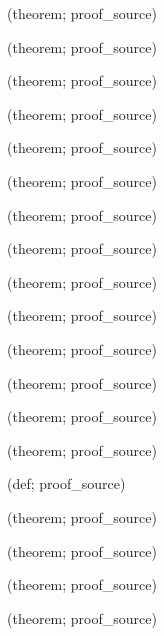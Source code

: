 \noindent{} {\scriptsize (theorem; proof\_source)}\par
\noindent{} {\scriptsize (theorem; proof\_source)}\par
\noindent{} {\scriptsize (theorem; proof\_source)}\par
\noindent{} {\scriptsize (theorem; proof\_source)}\par
\noindent{} {\scriptsize (theorem; proof\_source)}\par
\noindent{} {\scriptsize (theorem; proof\_source)}\par
\noindent{} {\scriptsize (theorem; proof\_source)}\par
\noindent{} {\scriptsize (theorem; proof\_source)}\par
\noindent{} {\scriptsize (theorem; proof\_source)}\par
\noindent{} {\scriptsize (theorem; proof\_source)}\par
\noindent{} {\scriptsize (theorem; proof\_source)}\par
\noindent{} {\scriptsize (theorem; proof\_source)}\par
\noindent{} {\scriptsize (theorem; proof\_source)}\par
\noindent{} {\scriptsize (theorem; proof\_source)}\par
\noindent{} {\scriptsize (def; proof\_source)}\par
\noindent{} {\scriptsize (theorem; proof\_source)}\par
\noindent{} {\scriptsize (theorem; proof\_source)}\par
\noindent{} {\scriptsize (theorem; proof\_source)}\par
\noindent{} {\scriptsize (theorem; proof\_source)}\par
\endgroup

